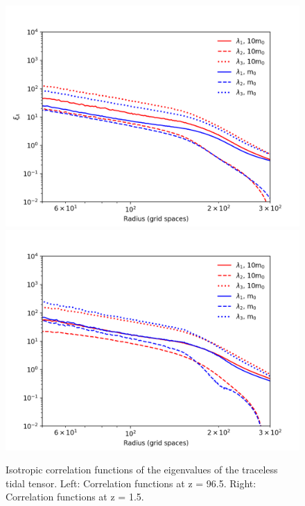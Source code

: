 \documentclass[a4paper,11pt]{article}
\begin{document}
\begin{figure}[!htb]
  \includegraphics[trim={1cm 0 0 0},scale=0.55]{iso_corr_single_7.png}
\endminipage\hfill
{}
  \includegraphics[trim={0 0 0 0},scale=0.55]{iso_corr_single_107.png}
\endminipage\hfill
\caption{Isotropic correlation functions of the eigenvalues of the traceless tidal tensor. Left: Correlation functions at z = 96.5. Right: Correlation functions at z = 1.5.}\label{fig:iso_corr}
\end{figure}
\end{document}
